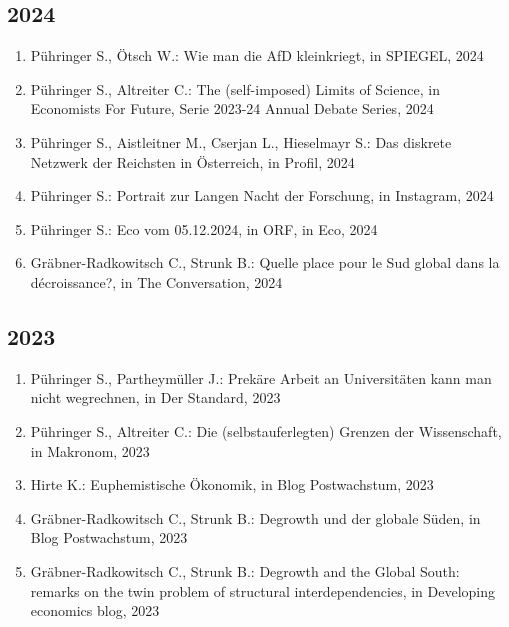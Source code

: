 \subsection*{2024}
\begin{enumerate}
    	 \item Pühringer S., Ötsch W.: Wie man die AfD kleinkriegt, in SPIEGEL, 2024
	 \item Pühringer S., Altreiter C.: The (self-imposed) Limits of Science, in Economists For Future, Serie 2023-24 Annual Debate Series, 2024
	 \item Pühringer S., Aistleitner M., Cserjan L., Hieselmayr S.: Das diskrete Netzwerk der Reichsten in Österreich, in Profil, 2024
	 \item Pühringer S.: Portrait zur Langen Nacht der Forschung, in Instagram, 2024
	 \item Pühringer S.: Eco vom 05.12.2024, in ORF, in Eco, 2024
	 \item Gräbner-Radkowitsch C., Strunk B.: Quelle place pour le Sud global dans la décroissance?, in The Conversation, 2024
\end{enumerate}
\subsection*{2023}
\begin{enumerate}
    	 \item Pühringer S., Partheymüller J.: Prekäre Arbeit an Universitäten kann man nicht wegrechnen, in Der Standard, 2023
	 \item Pühringer S., Altreiter C.: Die (selbstauferlegten) Grenzen der Wissenschaft, in Makronom, 2023
	 \item Hirte K.: Euphemistische Ökonomik, in Blog Postwachstum, 2023
	 \item Gräbner-Radkowitsch C., Strunk B.: Degrowth und der globale Süden, in Blog Postwachstum, 2023
	 \item Gräbner-Radkowitsch C., Strunk B.: Degrowth and the Global South: remarks on the twin problem of structural interdependencies, in Developing economics blog, 2023
\end{enumerate}
